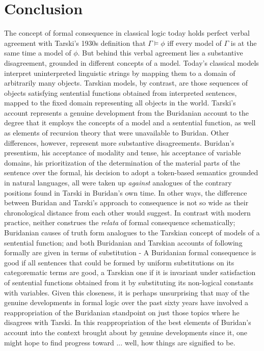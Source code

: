 \documentclass[]{article}
\begin{document}
\section{Conclusion}
The concept of formal consequence in classical logic today holds perfect verbal agreement with Tarski's 1930s definition that $\Gamma \models \phi$ iff every model of $\Gamma$ is at the same time a model of $\phi$. But behind this verbal agreement lies a substantive disagreement, grounded in different concepts of a model. Today's classical models interpret uninterpreted linguistic strings by mapping them to a domain of arbitrarily many objects. Tarskian models, by contrast, are those sequences of objects satisfying sentential functions obtained from interpreted sentences, mapped to the fixed domain representing all objects in the world. Tarski's account represents a genuine development from the Buridanian account to the degree that it employs the concepts of a model and a sentential function, as well as elements of recursion theory that were unavailable to Buridan. Other differences, however, represent more substantive disagreements. Buridan's presentism, his acceptance of modality and tense, his acceptance of variable domains, his prioritization of the determination of the material parts of the sentence over the formal, his decision to adopt a token-based semantics grounded in natural languages, all were taken up \textit{against} analogues of the contrary positions found in Tarski in Buridan's own time. In other ways, the difference between Buridan and Tarski's approach to consequence is not so wide as their chronological distance from each other would suggest. In contrast with modern practice, neither construes the \textit{relata} of formal consequence schematically; Buridanian causes of truth form analogues to the Tarskian concept of models of a sentential function; and both Buridanian and Tarskian accounts of following formally are given in terms of substitution - A Buridanian formal consequence is good if all sentences that could be formed by uniform substitutions on its categorematic terms are good, a Tarskian one if it is invariant under satisfaction of sentential functions obtained from it by substituting its non-logical constants with variables. Given this closeness, it is perhaps unsurprising that may of the genuine developments in formal logic over the past sixty years have involved a reappropriation of the Buridanian standpoint on just those topics where he disagrees with Tarski. In this reappropriation of the best elements of Buridan's account into the context brought about by genuine developments since it, one might hope to find progress toward ... well, how things are signified to be.


\end{document}
